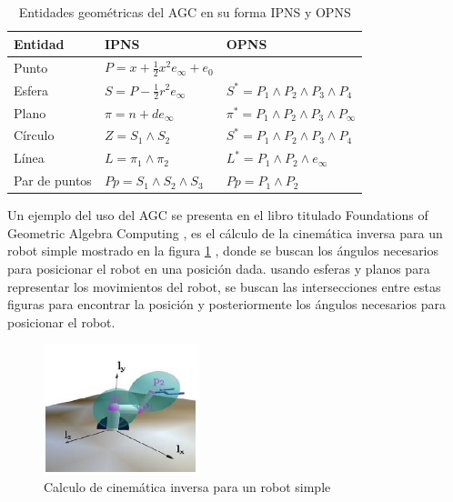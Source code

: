\begin{table}[!htb]
	\centering
	\caption{Entidades geométricas del AGC en su forma IPNS y OPNS}
	\label{AGCEntitis}
	\begin{tabular}{lll}
		\hline
		Entidad       & IPNS & OPNS \\ \hline
		Punto         & $P=x+\frac{1}{2}x^2e_\infty+e_0$     &      \\
		Esfera        & $S=P-\frac{1}{2}r^2 e_\infty$ & $S^*=P_1\wedge P_2\wedge P_3\wedge P_4 $ \\
		Plano         & $\pi = n+de_\infty$     & $\pi^*=P_1\wedge P_2\wedge P_3\wedge P_\infty$      \\
		Círculo       & $Z=S_1\wedge S_2$     & $S^*=P_1\wedge P_2\wedge P_3\wedge P_4 $    \\
		Línea         & $L=\pi_1 \wedge \pi_2$     & $L^*=P_1 \wedge P_2 \wedge e_\infty$      \\
		Par de puntos & $Pp=S_1 \wedge S_2 \wedge S_3$     &    $Pp=P_1 \wedge P_2$  \\ \hline
	\end{tabular}
\end{table}


Un ejemplo del uso del AGC se presenta en el libro titulado Foundations of Geometric Algebra Computing \cite{FoundOfAGC}, es el cálculo de la cinemática inversa para un robot simple mostrado en la figura \ref{fig:ejemplo} , donde se buscan los ángulos necesarios para posicionar el robot en una posición dada. usando esferas y planos para representar los movimientos del robot, se buscan las intersecciones entre estas figuras para encontrar la posición y posteriormente los ángulos necesarios para posicionar el robot.\\


\begin{figure}[!htb]
	\centering
	\includegraphics[width=0.4\textwidth]{01Introduccion/imagenes/ejemplo.jpg}
	\caption{Calculo de cinemática inversa para un robot simple} 
	\label{fig:ejemplo}
\end{figure}

